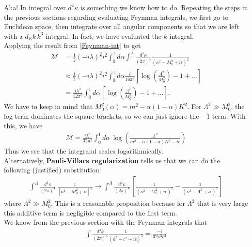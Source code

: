 \documentclass{book}
\theoremstyle{definition}
\newcommand{\f}[2]{\frac{#1}{#2}}
\newcommand{\lp}{\left(}
\newcommand{\rp}{\right)}
\newcommand{\lb}{\left[}
\newcommand{\rb}{\right]}
\begin{document}
Aha! In integral over $d^4 \kappa$ is something we know how to do. Repeating the steps in the previous sections regarding evaluating Feynman integrals, we first go to Euclidean space, then integrate over all angular components so that we are left with a $d_E k\, k^{3}$ integral. In fact, we have evaluated the $k$ integral. \\


Applying the result from \eqref{Feynman-int} to get
\begin{align}\label{exact}
\mathcal{M} &= \f{1}{2}(-i\lambda)^2 i^2  \int^1_0 d\alpha\int^{\Lambda} \f{d^4\kappa}{(2\pi)^4} \f{1}{(\kappa^2 - M_0^2+ i\epsilon)^2} \nonumber \\
&\approx \f{1}{2}(-i\lambda)^2 i^2  \int^1_0 d\alpha \f{i}{16\pi^2} \lb \log\lp \f{\Lambda^2}{M_0^2} \rp  - 1 + \dots \rb \nonumber\\
&= \f{i\lambda^2}{32\pi^2} \int^1_0 d\alpha\, \lb \log\lp \f{\Lambda^2}{M_0^2} \rp  - 1 + \dots \rb.
\end{align}
We have to keep in mind that $M_0^2(\alpha) = m^2  - \alpha(1 - \alpha)K^2$. For $\Lambda^2 \gg M_0^2$, the log term dominates the square brackets, so we can just ignore the $-1$ term. With this, we have
\begin{align}\label{amplitudeM}
\boxed{\mathcal{M}  = \f{i\lambda^2}{32\pi^2} \int^1_0 d\alpha\,  \log\lp \f{\Lambda^2}{m^2  - \alpha(1 - \alpha)K^2 - i\epsilon} \rp }
\end{align}
Thus we see that the integrand scales logarithmically. \\








Alternatively, \textbf{Pauli-Villars regularization} tells us that we can do the following (justified) substitution:
\begin{align}\label{Pauli-Villars}
\boxed{\int^\Lambda \f{d^4\kappa}{(2\pi)^4}  \, \f{1}{[\kappa^2 - M_0^2 + i\epsilon ]^2} \to \int^\Lambda \f{d^4\kappa}{(2\pi)^4}  \, \lb\f{1}{(\kappa^2 - M_0^2 + i\epsilon )^2} - \f{1}{(\kappa^2 - \Lambda^2 + i\epsilon)^2}\rb}
\end{align}
where $\Lambda^2 \gg M_0^2$. This is a reasonable proposition because for $\Lambda^2$ that is very large this additive term is negligible compared to the first term. \\



We know from the previous section with the Feynman integrals that
\begin{align}\label{feym}
{\int \f{d^4k}{(2\pi)^4} \f{1}{(k^2 - c^2+ i\epsilon)^3} = \f{-i}{32\pi^2 c^2}}
\end{align}
\end{document}
